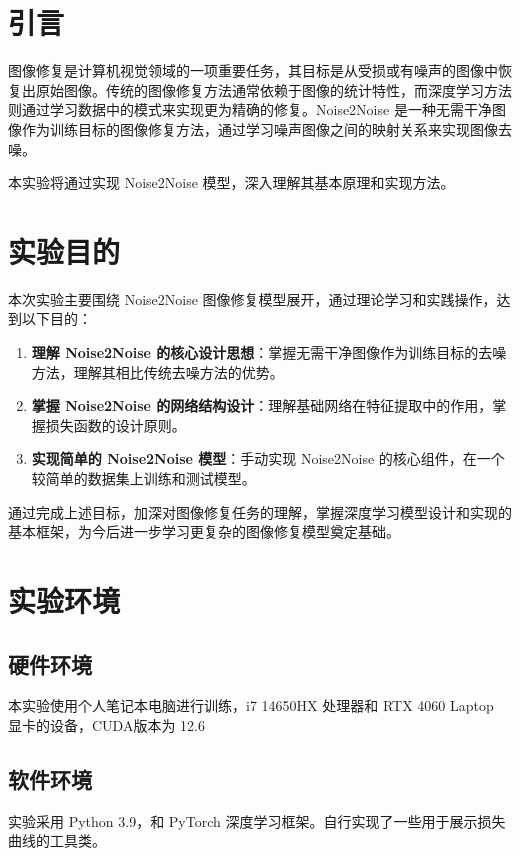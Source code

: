 \documentclass[UTF8]{ctexart}
\begin{document}
\tableofcontents  %

\newpage
\section{引言}

图像修复是计算机视觉领域的一项重要任务，其目标是从受损或有噪声的图像中恢复出原始图像。传统的图像修复方法通常依赖于图像的统计特性，而深度学习方法则通过学习数据中的模式来实现更为精确的修复。Noise2Noise 是一种无需干净图像作为训练目标的图像修复方法，通过学习噪声图像之间的映射关系来实现图像去噪。

本实验将通过实现 Noise2Noise 模型，深入理解其基本原理和实现方法。

\section{实验目的}
本次实验主要围绕 Noise2Noise 图像修复模型展开，通过理论学习和实践操作，达到以下目的：
\begin{enumerate}
    \item \textbf{理解 Noise2Noise 的核心设计思想}：掌握无需干净图像作为训练目标的去噪方法，理解其相比传统去噪方法的优势。
    \item \textbf{掌握 Noise2Noise 的网络结构设计}：理解基础网络在特征提取中的作用，掌握损失函数的设计原则。
    \item \textbf{实现简单的 Noise2Noise 模型}：手动实现 Noise2Noise 的核心组件，在一个较简单的数据集上训练和测试模型。
\end{enumerate}

通过完成上述目标，加深对图像修复任务的理解，掌握深度学习模型设计和实现的基本框架，为今后进一步学习更复杂的图像修复模型奠定基础。

\section{实验环境}
\subsection{硬件环境}
本实验使用个人笔记本电脑进行训练，i7 14650HX 处理器和 RTX 4060 Laptop 显卡的设备，CUDA版本为 12.6

\subsection{软件环境}
实验采用 Python 3.9，和 PyTorch 深度学习框架。自行实现了一些用于展示损失曲线的工具类。
\end{document}
